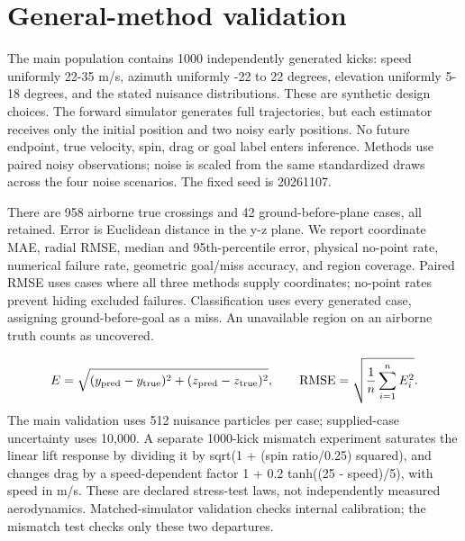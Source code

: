 \documentclass[11pt,a4paper]{article}
\begin{document}
\section{General-method validation}
The main population contains 1000 independently generated kicks: speed uniformly 22-35 m/s, azimuth uniformly -22 to 22 degrees, elevation uniformly 5-18 degrees, and the stated nuisance distributions. These are synthetic design choices. The forward simulator generates full trajectories, but each estimator receives only the initial position and two noisy early positions. No future endpoint, true velocity, spin, drag or goal label enters inference. Methods use paired noisy observations; noise is scaled from the same standardized draws across the four noise scenarios. The fixed seed is 20261107.

There are 958 airborne true crossings and 42 ground-before-plane cases, all retained. Error is Euclidean distance in the y-z plane. We report coordinate MAE, radial RMSE, median and 95th-percentile error, physical no-point rate, numerical failure rate, geometric goal/miss accuracy, and region coverage. Paired RMSE uses cases where all three methods supply coordinates; no-point rates prevent hiding excluded failures. Classification uses every generated case, assigning ground-before-goal as a miss. An unavailable region on an airborne truth counts as uncovered.

\begin{equation}
E=\sqrt{(y_{\rm pred}-y_{\rm true})^2+(z_{\rm pred}-z_{\rm true})^2},\qquad {\rm RMSE}=\sqrt{\frac{1}{n}\sum_{i=1}^n E_i^2}.
\end{equation}
The main validation uses 512 nuisance particles per case; supplied-case uncertainty uses 10,000. A separate 1000-kick mismatch experiment saturates the linear lift response by dividing it by sqrt(1 + (spin ratio/0.25) squared), and changes drag by a speed-dependent factor 1 + 0.2 tanh((25 - speed)/5), with speed in m/s. These are declared stress-test laws, not independently measured aerodynamics. Matched-simulator validation checks internal calibration; the mismatch test checks only these two departures.
\end{document}
